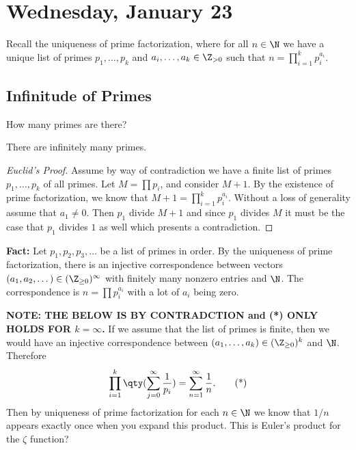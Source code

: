 
\section{Wednesday, January 23}

Recall the uniqueness of prime factorization, where for all $n \in \N$ we have a unique list of primes $p_1, \dotsc, p_k$ and $a_i, \dotsc, a_k \in \Z_{>0}$ such that $n = \prod_{i=1}^k p_i^{a_i}$.

\subsection{Infinitude of Primes}
\begin{problem}
How many primes are there?
\end{problem}

\begin{theorem}
There are infinitely many primes.
\end{theorem}

\begin{proof}[Euclid's Proof]
Assume by way of contradiction we have a finite list of primes $p_1, \dotsc, p_k$ of all primes. Let $M = \prod p_i$, and consider $M+1$. By the existence of prime factorization, we know that $M+1 = \prod_{i=1}^k p_i^{a_i}$. Without a loss of generality assume that $a_1 \not= 0$. Then $p_1$ divide $M+1$ and since $p_1$ divides $M$ it must be the case that $p_1$ divides $1$ as well which presents a contradiction.
\end{proof}

\textbf{Fact:} Let $p_1, p_2, p_3, \dotsc$ be a list of primes in order. By the uniqueness of prime factorization, there is an injective correspondence between vectors $(a_1, a_2, \dotsc) \in (\Z_{\geq0})^\infty$ with finitely many nonzero entries and $\N$. The correspondence is $n = \prod p_i^{a_i}$ with a lot of $a_i$ being zero.

\textbf{NOTE: THE BELOW IS BY CONTRADCTION and (*) ONLY HOLDS FOR $k=\infty$.}
If we assume that the list of primes is finite, then we would have an injective correspondence between $(a_1, \dotsc, a_k) \in (\Z_{\geq 0})^k$ and $\N$. Therefore
\[ \prod_{i=1}^k\qty(\sum_{j=0}^\infty \frac{1}{p_i}) = \sum_{n=1}^\infty \frac{1}{n}. \tag{*} \]
Then by uniqueness of prime factorization for each $n \in \N$ we know that $1/n$ appears exactly once when you expand this product. This is Euler's product for the $\zeta$ function?

